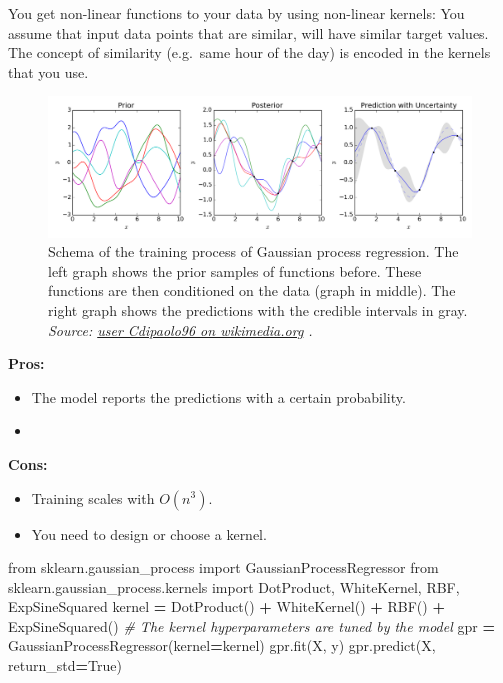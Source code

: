 \documentclass[
]{book}
\newenvironment{Shaded}{\begin{snugshade}}{\end{snugshade}}
\newcommand{\CommentTok}[1]{\textcolor[rgb]{0.56,0.35,0.01}{\textit{#1}}}
\newcommand{\ImportTok}[1]{#1}
\newcommand{\NormalTok}[1]{#1}
\newcommand{\OperatorTok}[1]{\textcolor[rgb]{0.81,0.36,0.00}{\textbf{#1}}}
\newcommand{\VariableTok}[1]{\textcolor[rgb]{0.00,0.00,0.00}{#1}}
\begin{document}
You get non-linear functions to your data by using non-linear kernels:
You assume that input data points that are similar, will have similar
target values. The concept of similarity (e.g.~same hour of the day) is
encoded in the kernels that you use.

\begin{figure}
\centering
\includegraphics{figures/Gaussian_Process_Regression.png}
\caption{Schema of the training process of Gaussian process regression. The
left graph shows the prior samples of functions before. These functions
are then conditioned on the data (graph in middle). The right graph
shows the predictions with the credible intervals in gray. \emph{Source:
\href{https://commons.wikimedia.org/wiki/File:Gaussian_Process_Regression.png}{user Cdipaolo96 on
wikimedia.org}
.}}
\end{figure}

\textbf{Pros:}

\begin{itemize}
\item
  The model reports the predictions with a certain probability.
\item
\end{itemize}

\textbf{Cons:}

\begin{itemize}
\item
  Training scales with \(O(n^3)\).
\item
  You need to design or choose a kernel.
\end{itemize}

\begin{Shaded}
\begin{Highlighting}[]
\ImportTok{from}\NormalTok{ sklearn.gaussian\_process }\ImportTok{import}\NormalTok{ GaussianProcessRegressor}
\ImportTok{from}\NormalTok{ sklearn.gaussian\_process.kernels }\ImportTok{import}\NormalTok{ DotProduct, WhiteKernel, RBF, ExpSineSquared}
\NormalTok{kernel }\OperatorTok{=}\NormalTok{ DotProduct() }\OperatorTok{+}\NormalTok{ WhiteKernel() }\OperatorTok{+}\NormalTok{ RBF() }\OperatorTok{+}\NormalTok{ ExpSineSquared() }\CommentTok{\# The kernel hyperparameters are tuned by the model}
\NormalTok{gpr }\OperatorTok{=}\NormalTok{ GaussianProcessRegressor(kernel}\OperatorTok{=}\NormalTok{kernel)}
\NormalTok{gpr.fit(X, y)}
\NormalTok{gpr.predict(X, return\_std}\OperatorTok{=}\VariableTok{True}\NormalTok{)}
\end{Highlighting}
\end{Shaded}
\end{document}
